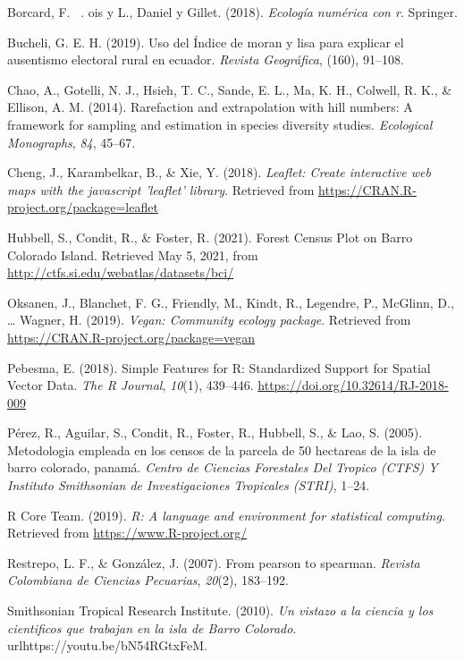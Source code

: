 \documentclass[11pt,]{article}
\begin{document}
\hypertarget{ref-borcard2018numerical}{}
Borcard, F. ~. ois y L., Daniel y Gillet. (2018). \emph{Ecología
numérica con r}. Springer.

\hypertarget{ref-bucheli2019uso}{}
Bucheli, G. E. H. (2019). Uso del Índice de moran y lisa para explicar
el ausentismo electoral rural en ecuador. \emph{Revista Geográfica},
(160), 91--108.

\hypertarget{ref-paqueteiNEXT}{}
Chao, A., Gotelli, N. J., Hsieh, T. C., Sande, E. L., Ma, K. H.,
Colwell, R. K., \& Ellison, A. M. (2014). Rarefaction and extrapolation
with hill numbers: A framework for sampling and estimation in species
diversity studies. \emph{Ecological Monographs}, \emph{84}, 45--67.

\hypertarget{ref-leaflet}{}
Cheng, J., Karambelkar, B., \& Xie, Y. (2018). \emph{Leaflet: Create
interactive web maps with the javascript 'leaflet' library}. Retrieved
from \url{https://CRAN.R-project.org/package=leaflet}

\hypertarget{ref-webcenso}{}
Hubbell, S., Condit, R., \& Foster, R. (2021). Forest Census Plot on
Barro Colorado Island. Retrieved May 5, 2021, from
\url{http://ctfs.si.edu/webatlas/datasets/bci/}

\hypertarget{ref-vegan}{}
Oksanen, J., Blanchet, F. G., Friendly, M., Kindt, R., Legendre, P.,
McGlinn, D., \ldots{} Wagner, H. (2019). \emph{Vegan: Community ecology
package}. Retrieved from \url{https://CRAN.R-project.org/package=vegan}

\hypertarget{ref-sf}{}
Pebesma, E. (2018). Simple Features for R: Standardized Support for
Spatial Vector Data. \emph{The R Journal}, \emph{10}(1), 439--446.
\url{https://doi.org/10.32614/RJ-2018-009}

\hypertarget{ref-perez2005metodologia}{}
Pérez, R., Aguilar, S., Condit, R., Foster, R., Hubbell, S., \& Lao, S.
(2005). Metodologia empleada en los censos de la parcela de 50 hectareas
de la isla de barro colorado, panamá. \emph{Centro de Ciencias
Forestales Del Tropico (CTFS) Y Instituto Smithsonian de Investigaciones
Tropicales (STRI)}, 1--24.

\hypertarget{ref-citadeR}{}
R Core Team. (2019). \emph{R: A language and environment for statistical
computing}. Retrieved from \url{https://www.R-project.org/}

\hypertarget{ref-restrepo2007pearson}{}
Restrepo, L. F., \& González, J. (2007). From pearson to spearman.
\emph{Revista Colombiana de Ciencias Pecuarias}, \emph{20}(2), 183--192.

\hypertarget{ref-bci_video}{}
Smithsonian Tropical Research Institute. (2010). \emph{Un vistazo a la
ciencia y los cientificos que trabajan en la isla de Barro Colorado}.
urlhttps://youtu.be/bN54RGtxFeM.
\end{document}
